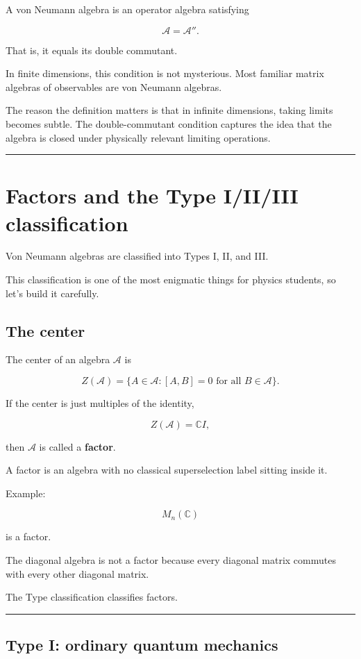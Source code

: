 \documentclass[11pt,a4paper]{article}
\begin{document}
A von Neumann algebra is an operator algebra satisfying

\[
\mathcal{A}=\mathcal{A}''.
\]

That is, it equals its double commutant.

In finite dimensions, this condition is not mysterious. Most familiar matrix algebras of observables are von Neumann algebras.

The reason the definition matters is that in infinite dimensions, taking limits becomes subtle. The double-commutant condition captures the idea that the algebra is closed under physically relevant limiting operations.

\medskip\hrule\medskip

\section{Factors and the Type I/II/III classification}

Von Neumann algebras are classified into Types I, II, and III.

This classification is one of the most enigmatic things for physics students, so let’s build it carefully.

\subsection{The center}

The center of an algebra $\mathcal{A}$ is

\[
Z(\mathcal{A})=\{A\in\mathcal{A}:[A,B]=0\text{ for all }B\in\mathcal{A}\}.
\]

If the center is just multiples of the identity,

\[
Z(\mathcal{A})=\mathbb{C}I,
\]

then $\mathcal{A}$ is called a \textbf{factor}.

A factor is an algebra with no classical superselection label sitting inside it.

Example:

\[
M_n(\mathbb{C})
\]

is a factor.

The diagonal algebra is not a factor because every diagonal matrix commutes with every other diagonal matrix.

The Type classification classifies factors.

\medskip\hrule\medskip

\subsection{Type I: ordinary quantum mechanics}
\end{document}
